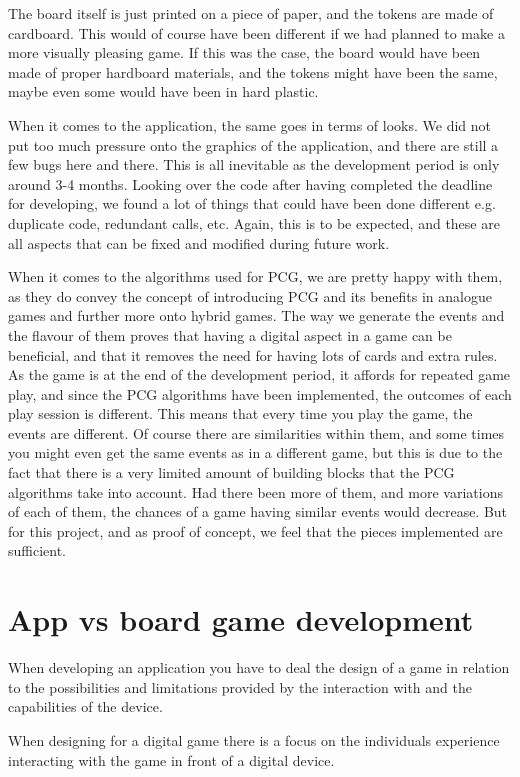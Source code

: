 The board itself is just printed on a piece of paper, and the tokens are made of cardboard. This would of course have been different if we had planned to make a more visually pleasing game. If this was the case, the board would have been made of proper hardboard materials, and the tokens might have been the same, maybe even some would have been in hard plastic. 

When it comes to the application, the same goes in terms of looks. We did not put too much pressure onto the graphics of the application, and there are still a few bugs here and there. This is all inevitable as the development period is only around 3-4 months. Looking over the code after having completed the deadline for developing, we found a lot of things that could have been done different e.g. duplicate code, redundant calls, etc.
Again, this is to be expected, and these are all aspects that can be fixed and modified during future work.

When it comes to the algorithms used for PCG, we are pretty happy with them, as they do convey the concept of introducing PCG and its benefits in analogue games and further more onto hybrid games. The way we generate the events and the flavour of them proves that having a digital aspect in a game can be beneficial, and that it removes the need for having lots of cards and extra rules. As the game is at the end of the development period, it affords for repeated game play, and since the PCG algorithms have been implemented, the outcomes of each play session is different. This means that every time you play the game, the events are different. Of course there are similarities within them, and some times you might even get the same events as in a different game, but this is due to the fact that there is a very limited amount of building blocks that the PCG algorithms take into account. Had there been more of them, and more variations of each of them, the chances of a game having similar events would decrease. But for this project, and as proof of concept, we feel that the pieces implemented are sufficient.

\section{App vs board game development}
When developing an application you have to deal the design of a game in relation to the possibilities and limitations provided by the interaction with and the capabilities of the device. 

When designing for a digital game there is a focus on the individuals experience interacting with the game in front of a digital device. 

